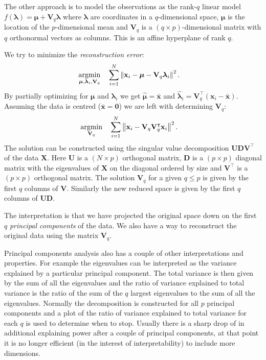 \documentclass[a4paper, 12pt]{scrartcl}
\newcommand{\bflambda}{\boldsymbol{\lambda}}
\newcommand{\bfmu}{\boldsymbol{\mu}}
\newcommand{\bfx}{\mathbf{x}}
\begin{document}
The other approach is to model the observations as the rank-$q$ linear model $f(\bflambda)=\bfmu + \mathbf{V}_q\bflambda$ where $\bflambda$ are coordinates in a $q$-dimensional space, $\bfmu$ is the location of the $p$-dimensional mean and $\mathbf{V}_q$ is a $\left(q\times p\right)$-dimensional matrix with $q$ orthonormal vectors as columns.
This is an affine hyperplane of rank $q$.
\begin{algorithm}
	We try to minimize the \emph{reconstruction error}:
	\begin{equation*}
	\begin{aligned}
		\operatornamewithlimits{argmin}_{\bfmu, \bflambda_i, \mathbf{V}_q} & & &\sum_{i=1}^{N}\left\|\bfx_i-\bfmu-\mathbf{V}_q\bflambda_i\right\|^2.
	\end{aligned}
	\end{equation*}
	By partially optimizing for $\boldsymbol{\mu}$ and $\bflambda_i$ we get $\hat{\boldsymbol{\mu}} = \bar{\bfx}$ and $\hat{\bflambda}_i=\mathbf{V}_q^\intercal \left(\bfx_i-\bar{\bfx}\right)$.
	Assuming the data is centred ($\bar{\bfx}=\mathbf{0}$) we are left with determining $\mathbf{V}_q$:
	\begin{equation*}
	\begin{aligned}
	\operatornamewithlimits{argmin}_{\mathbf{V}_q} & & &\sum_{i=1}^{N}\left\|\bfx_i-\mathbf{V}_q\mathbf{V}_q^\intercal\bfx_i\right\|^2.
	\end{aligned}
	\end{equation*}
	The solution can be constructed using the singular value decomposition $\mathbf{U}\mathbf{D}\mathbf{V}^\intercal$ of the data $\mathbf{X}$.
	Here $\mathbf{U}$ is a $\left(N\times p\right)$ orthogonal matrix, $\mathbf{D}$ is a $\left(p\times p\right)$ diagonal matrix with the eigenvalues of $\mathbf{X}$ on the diagonal ordered by size and $\mathbf{V}^\intercal$ is a $\left(p\times p\right)$ orthogonal matrix. The solution $\mathbf{V}_q$ for a given $q\leq p$ is given by the first $q$ columns of $\mathbf{V}$.
	Similarly the new reduced space is given by the first $q$ columns of $\mathbf{U}\mathbf{D}$.
	
	The interpretation is that we have projected the original space down on the first $q$ \emph{principal components} of the data.
	We also have a way to reconstruct the original data using the matrix $\mathbf{V}_q$.
\end{algorithm}

Principal components analysis also has a couple of other interpretations and properties.
For example the eigenvalues can be interpreted as the variance explained by a particular principal component.
The total variance is then given by the sum of all the eigenvalues and the ratio of variance explained to total variance is the ratio of the sum of the $q$ largest eigenvalues to the sum of all the eigenvalues.
Normally the decomposition is constructed for all $p$ principal components and a plot of the ratio of variance explained to total variance for each $q$ is used to determine when to stop.
Usually there is a sharp drop of in additional explaining power after a couple of principal components, at that point it is no longer efficient (in the interest of interpretability) to include more dimensions.
\end{document}
